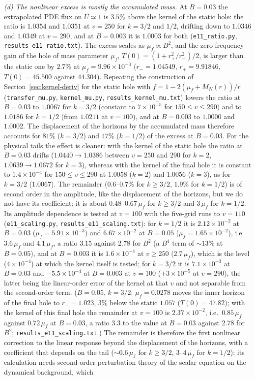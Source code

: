 \documentclass[11pt]{article}
\begin{document}
\emph{(d) The nonlinear excess is mostly the accumulated mass.} At $B=0.03$ the extrapolated PDE flux on $U\simeq1$ is $3.5\%$ above the kernel of the static hole: the ratio is $1.0354$ and $1.0351$ at $v=250$ for $k=3/2$ and $1/2$, drifting down to $1.0346$ and $1.0349$ at $v=290$, and at $B=0.003$ it is $1.0003$ for both (\texttt{e11\_ratio.py}, \texttt{results\_e11\_ratio.txt}). The excess scales as $\mu_f\propto B^2$, and the zero-frequency gain of the hole of mass parameter $\mu_f$, $T(0)=(1+r_+^2/r_-^2)/2$, is larger than the static one by $2.7\%$ at $\mu_f=9.96\times10^{-3}$ ($r_-=1.04549$, $r_+=9.91846$, $T(0)=45.500$ against $44.304$). Repeating the construction of Section~\ref{sec:kernel-deriv} for the static hole with $f=1-2(\mu_f+M_N(r))/r$ (\texttt{transfer\_mu.py}, \texttt{kernel\_mu.py}, \texttt{results\_kernel\_mu.txt}) lowers the ratio at $B=0.03$ to $1.0067$ for $k=3/2$ (constant to $7\times10^{-5}$ for $150\le v\le290$) and to $1.0186$ for $k=1/2$ (from $1.0211$ at $v=100$), and at $B=0.003$ to $1.0000$ and $1.0002$. The displacement of the horizons by the accumulated mass therefore accounts for $81\%$ ($k=3/2$) and $47\%$ ($k=1/2$) of the excess at $B=0.03$. For the physical tails the effect is cleaner: with the kernel of the static hole the ratio at $B=0.03$ drifts ($1.0440\to1.0386$ between $v=250$ and $290$ for $k=2$, $1.0639\to1.0672$ for $k=3$), whereas with the kernel of the final hole it is constant to $1.4\times10^{-4}$ for $150\le v\le290$ at $1.0058$ ($k=2$) and $1.0056$ ($k=3$), as for $k=3/2$ ($1.0067$). The remainder ($0.6$--$0.7\%$ for $k\ge3/2$, $1.9\%$ for $k=1/2$) is of second order in the amplitude, like the displacement of the horizons, but we do not have its coefficient: it is about $0.48$--$0.67\,\mu_f$ for $k\ge3/2$ and $3\,\mu_f$ for $k=1/2$. Its amplitude dependence is tested at $v=100$ with the five-grid runs to $v=110$ (\texttt{e11\_scaling.py}, \texttt{results\_e11\_scaling.txt}): for $k=1/2$ it is $2.12\times10^{-2}$ at $B=0.03$ ($\mu_f=5.91\times10^{-3}$) and $6.67\times10^{-2}$ at $B=0.05$ ($\mu_f=1.65\times10^{-2}$), i.e.\ $3.6\,\mu_f$ and $4.1\,\mu_f$, a ratio $3.15$ against $2.78$ for $B^2$ (a $B^4$ term of $\sim13\%$ at $B=0.05$), and at $B=0.003$ it is $1.6\times10^{-4}$ at $v\ge250$ ($2.7\,\mu_f$), which is the level ($4\times10^{-4}$) at which the kernel itself is tested; for $k=3/2$ it is $7.1\times10^{-3}$ at $B=0.03$ and $-5.5\times10^{-4}$ at $B=0.003$ at $v=100$ ($+3\times10^{-5}$ at $v=290$), the latter being the linear-order error of the kernel at that $v$ and not separable from the second-order term. ($B=0.05$, $k=3/2$: $\mu_f=0.0278$ moves the inner horizon of the final hole to $r_-=1.023$, $3\%$ below the static $1.057$ ($T(0)=47.82$); with the kernel of this final hole the remainder at $v=100$ is $2.37\times10^{-2}$, i.e.\ $0.85\,\mu_f$ against $0.72\,\mu_f$ at $B=0.03$, a ratio $3.3$ to the value at $B=0.03$ against $2.78$ for $B^2$; \texttt{results\_e11\_scaling.txt}.) The remainder is therefore the first nonlinear correction to the linear response beyond the displacement of the horizons, with a coefficient that depends on the tail ($\sim0.6\,\mu_f$ for $k\ge3/2$, $3$--$4\,\mu_f$ for $k=1/2$); its calculation needs second-order perturbation theory of the scalar equation on the dynamical background, which 
\end{document}
